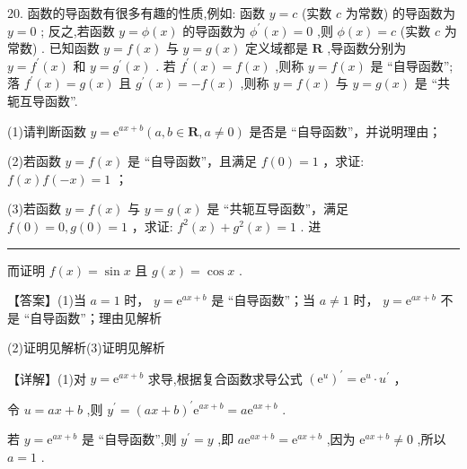 \documentclass[10pt]{article}
\newcommand{\HRule}{\begin{center}\rule{0.9\linewidth}{0.2mm}\end{center}}
\begin{document}
20. 函数的导函数有很多有趣的性质,例如: 函数 \(y = c\) (实数 \(c\) 为常数) 的导函数为 \(y = 0\) ; 反之,若函数 \(y = \phi \left( x\right)\) 的导函数为 \({\phi }^{\prime }\left( x\right)  = 0\) ,则 \(\phi \left( x\right)  = c\) (实数 \(c\) 为常数) . 已知函数 \(y = f\left( x\right)\) 与 \(y = g\left( x\right)\) 定义域都是 \(\mathbf{R}\) ,导函数分别为 \(y = {f}^{\prime }\left( x\right)\) 和 \(y = {g}^{\prime }\left( x\right)\) . 若 \({f}^{\prime }\left( x\right)  = f\left( x\right)\) ,则称 \(y = f\left( x\right)\) 是 “自导函数”; 落 \({f}^{\prime }\left( x\right)  = g\left( x\right)\) 且 \({g}^{\prime }\left( x\right)  =  - f\left( x\right)\) ,则称 \(y = f\left( x\right)\) 与 \(y = g\left( x\right)\) 是 “共轭互导函数”.

(1)请判断函数 \(y = {\mathrm{e}}^{{ax} + b}\left( {a,b \in  \mathbf{R},a \neq  0}\right)\) 是否是 “自导函数”，并说明理由；

(2)若函数 \(y = f\left( x\right)\) 是 “自导函数”，且满足 \(f\left( 0\right)  = 1\) ，求证: \(f\left( x\right) f\left( {-x}\right)  = 1\) ；

(3)若函数 \(y = f\left( x\right)\) 与 \(y = g\left( x\right)\) 是 “共轭互导函数”，满足 \(f\left( 0\right)  = 0,g\left( 0\right)  = 1\) ，求证: \({f}^{2}\left( x\right)  + {g}^{2}\left( x\right)  = 1\) . 进

\HRule

而证明 \(f\left( x\right)  = \sin x\) 且 \(g\left( x\right)  = \cos x\) .

\hspace*{12em} 【答案】(1)当 \(a = 1\) 时， \(y = {\mathrm{e}}^{{ax} + b}\) 是 “自导函数”；当 \(a \neq  1\) 时， \(y = {\mathrm{e}}^{{ax} + b}\) 不是 “自导函数”；理由见解析

\hspace*{1em} (2)证明见解析(3)证明见解析

\hspace*{9em} 【详解】(1)对 \(y = {\mathrm{e}}^{{ax} + b}\) 求导,根据复合函数求导公式 \({\left( {\mathrm{e}}^{u}\right) }^{\prime } = {\mathrm{e}}^{u} \cdot  {u}^{\prime }\) ，

\hspace*{1em} 令 \(u = {ax} + b\) ,则 \({y}^{\prime } = {\left( ax + b\right) }^{\prime }{\mathrm{e}}^{{ax} + b} = a{\mathrm{e}}^{{ax} + b}\) .

若 \(y = {\mathrm{e}}^{{ax} + b}\) 是 “自导函数”,则 \({y}^{\prime } = y\) ,即 \(a{\mathrm{e}}^{{ax} + b} = {\mathrm{e}}^{{ax} + b}\) ,因为 \({\mathrm{e}}^{{ax} + b} \neq  0\) ,所以 \(a = 1\) .
\end{document}
